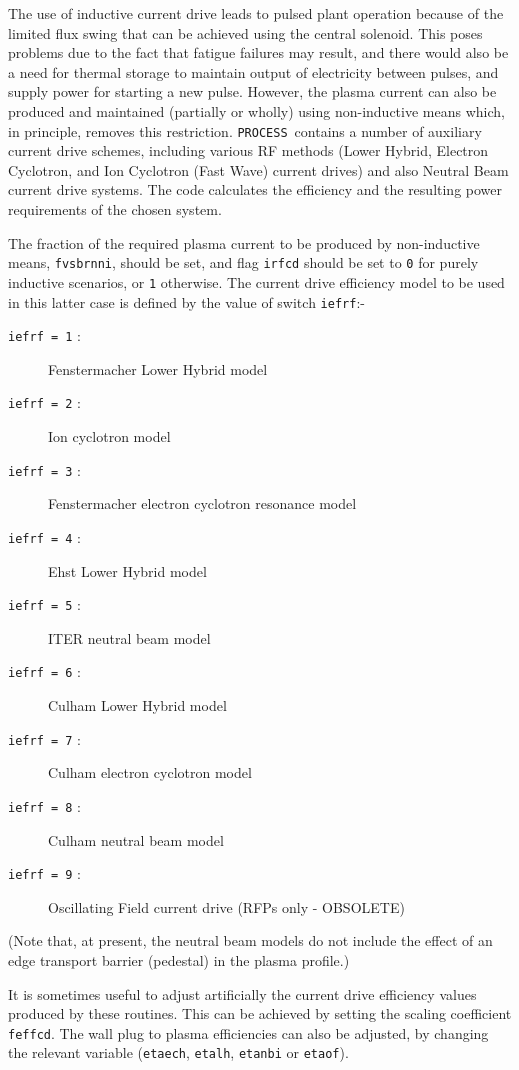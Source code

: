 \documentclass[11pt,a4paper]{report}
\newcommand{\process}{\mbox{\texttt{PROCESS}}}
\begin{document}
The use of inductive current drive leads to pulsed plant operation
because of the limited flux swing that can be achieved using the central
solenoid. This poses problems due to the fact that fatigue failures may
result, and there would also be a need for thermal storage to maintain output of electricity
between pulses, and supply power for starting a new pulse. However, the plasma current can also be produced and
maintained (partially or wholly) using non-inductive means which, in
principle, removes this restriction. \process\ contains a number of auxiliary
current drive schemes, including various RF methods (Lower Hybrid, Electron
Cyclotron, and Ion Cyclotron (Fast Wave) current drives) and also Neutral Beam
current drive systems. The code calculates the efficiency and the resulting
power requirements of the chosen system.

The fraction of the required plasma current to be produced by non-inductive
means, \texttt{fvsbrnni}, should be set, and flag \texttt{irfcd} should be set
to \texttt{0} for purely inductive scenarios, or \texttt{1} otherwise. The
current drive efficiency model to be used in this latter case is defined by
the value of switch \texttt{iefrf}:-
\begin{description}
\item [\texttt{iefrf = 1} :] Fenstermacher Lower Hybrid model
\item [\texttt{iefrf = 2} :] Ion cyclotron model~\cite{IPDG}
\item [\texttt{iefrf = 3} :] Fenstermacher electron cyclotron resonance model
\item [\texttt{iefrf = 4} :] Ehst Lower Hybrid model
\item [\texttt{iefrf = 5} :] ITER neutral beam model~\cite{IPDG,172}
\item [\texttt{iefrf = 6} :] Culham Lower Hybrid model~\cite{172}
\item [\texttt{iefrf = 7} :] Culham electron cyclotron model~\cite{172}
\item [\texttt{iefrf = 8} :] Culham neutral beam model~\cite{172}
\item [\texttt{iefrf = 9} :] Oscillating Field current drive (RFPs only - OBSOLETE)
\end{description}

(Note that, at present, the neutral beam models do not include the effect of an edge transport barrier (pedestal) in the plasma profile.)

It is sometimes useful to adjust artificially the current drive efficiency
values produced by these routines. This can be achieved by setting the scaling
coefficient \texttt{feffcd}. The wall plug to plasma efficiencies can also be
adjusted, by changing the relevant variable (\texttt{etaech}, \texttt{etalh},
\texttt{etanbi} or \texttt{etaof}).
\end{document}
